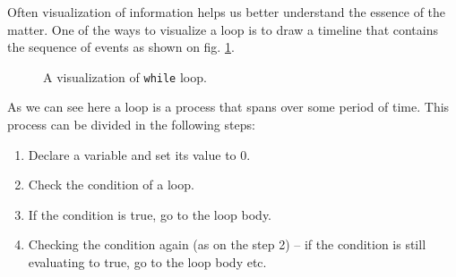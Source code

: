 \documentclass[../sparc.tex]{subfiles}
\begin{document}
Often visualization of information helps us better understand the essence of the
matter.  One of the ways to visualize a loop is to draw a timeline that contains
the sequence of events as shown on fig. \ref{fig:control-flow-while-loop}.

\begin{figure}[ht]
  \centering
  \label{fig:control-flow-while-loop}
  \caption{A visualization of \texttt{while} loop.}
\end{figure}

As we can see here a loop is a process that spans over some period of time.
This process can be divided in the following steps:

\begin{enumerate}
\item Declare a variable and set its value to 0.
\item Check the condition of a loop.
\item If the condition is true, go to the loop body.
\item Checking the condition again (as on the step 2) -- if the condition is
  still evaluating to true, go to the loop body etc.
\end{enumerate}
\end{document}
